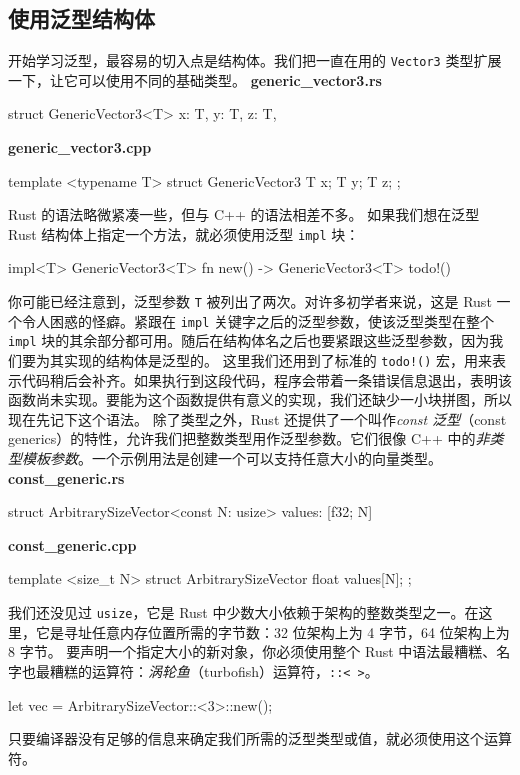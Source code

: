 \subsection{使用泛型结构体}
\label{idx:idx_20d20764}
\label{idx:idx_b6eaae6b}
开始学习泛型，最容易的切入点是结构体。我们把一直在用的 \texttt{Vector3} 类型扩展一下，让它可以使用不同的基础类型。
\textbf{generic\_\allowbreak{}vector3.\allowbreak{}rs}
\begin{codebox}[rust]
struct GenericVector3<T> {
    x: T,
    y: T,
    z: T,
}
\end{codebox}
\textbf{generic\_\allowbreak{}vector3.\allowbreak{}cpp}
\begin{codebox}[rust]
template <typename T>
struct GenericVector3 {
    T x;
    T y;
    T z;
};
\end{codebox}
Rust 的语法略微紧凑一些，但与 C++ 的语法相差不多。
如果我们想在泛型 Rust 结构体上指定一个方法，就必须使用泛型 \texttt{impl} 块：
\begin{codebox}[rust]
impl<T> GenericVector3<T> {
    fn new() -> GenericVector3<T> {
        todo!()
    }
}
\end{codebox}
你可能已经注意到，泛型参数 \texttt{T} 被列出了两次。对许多初学者来说，这是 Rust 一个令人困惑的怪癖。紧跟在 \texttt{impl} 关键字之后的泛型参数，使该泛型类型在整个 \texttt{impl} 块的其余部分都可用。随后在结构体名之后也要紧跟这些泛型参数，因为我们要为其实现的结构体是泛型的。
这里我们还用到了标准的 \texttt{todo!()} 宏，用来表示代码稍后会补齐。如果执行到这段代码，程序会带着一条错误信息退出，表明该函数尚未实现。要能为这个函数提供有意义的实现，我们还缺少一小块拼图，所以现在先记下这个语法。
\label{idx:idx_8d23cbf8}
\label{idx:idx_95948366}
\label{idx:idx_73a8ae45}
\label{idx:idx_ba2a0e00}
除了类型之外，Rust 还提供了一个叫作\emph{const 泛型}（const generics）的特性，允许我们把整数类型用作泛型参数。它们很像 C++ 中的\emph{非类型模板参数}。一个示例用法是创建一个可以支持任意大小的向量类型。
\textbf{const\_\allowbreak{}generic.\allowbreak{}rs}
\begin{codebox}[rust]
struct ArbitrarySizeVector<const N: usize> {
    values: [f32; N]
}
\end{codebox}
\textbf{const\_\allowbreak{}generic.\allowbreak{}cpp}
\begin{codebox}[rust]
template <size_t N>
struct ArbitrarySizeVector {
    float values[N];
};
\end{codebox}
我们还没见过 \texttt{usize}，它是 Rust 中少数大小依赖于架构的整数类型之一。在这里，它是寻址任意内存位置所需的字节数：32 位架构上为 4 字节，64 位架构上为 8 字节。
要声明一个指定大小的新对象，你必须使用整个 Rust 中语法最糟糕、名字也最糟糕的运算符：\emph{涡轮鱼}（turbofish）运算符，\texttt{::< >}。
\begin{codebox}[rust]
let vec = ArbitrarySizeVector::<3>::new();
\end{codebox}
\label{idx:idx_10e734f2}
\label{idx:idx_aedb192f}
只要编译器没有足够的信息来确定我们所需的泛型类型或值，就必须使用这个运算符。
